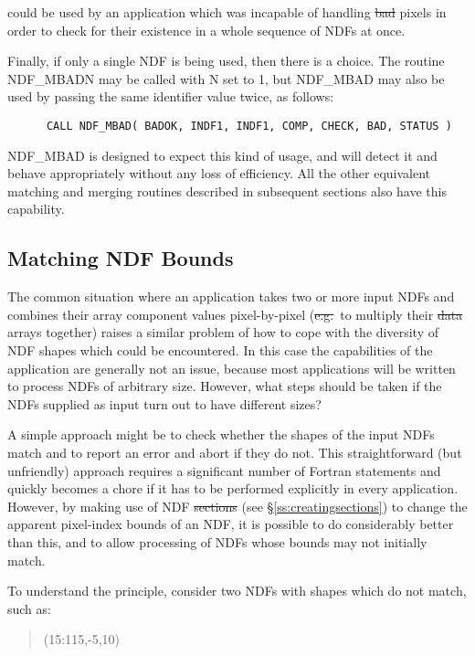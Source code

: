could be used by an application which was incapable of handling \st{bad\/}
pixels in order to check for their existence in a whole sequence of NDFs at
once. 

Finally, if only a single NDF is being used, then there is a choice. 
The routine NDF\_MBADN may be called with N set to 1, but NDF\_MBAD may also
be used by passing the same identifier value twice, as follows: 

\small
\begin{verbatim}
      CALL NDF_MBAD( BADOK, INDF1, INDF1, COMP, CHECK, BAD, STATUS )
\end{verbatim}
\normalsize

NDF\_MBAD is designed to expect this kind of usage, and will detect it and
behave appropriately without any loss of efficiency. 
All the other equivalent matching and merging routines described in
subsequent sections also have this capability. 

\subsection{\label{ss:mbnd}Matching NDF Bounds}

The common situation where an application takes two or more input NDFs and
combines their array component values pixel-by-pixel (\st{e.g.}\ to
multiply their \st{data\/} arrays together) raises a similar problem of how
to cope with the diversity of NDF shapes which could be encountered. 
In this case the capabilities of the application are generally not an issue,
because most applications will be written to process NDFs of arbitrary size. 
However, what steps should be taken if the NDFs supplied as input turn out
to have different sizes? 

A simple approach might be to check whether the shapes of the input NDFs
match and to report an error and abort if they do not. 
This straightforward (but unfriendly) approach requires a significant number
of Fortran statements and quickly becomes a chore if it has to be performed
explicitly in every application. 
However, by making use of NDF \st{sections\/} (see
\S\ref{ss:creatingsections}) to change the apparent pixel-index bounds of an
NDF, it is possible to do considerably better than this, and to allow
processing of NDFs whose bounds may not initially match. 

To understand the principle, consider two NDFs with shapes which do not 
match, such as:

\small
\begin{quote}
\begin{center}
(15:115,-5,10)
\end{center}
\end{quote}
\normalsize

